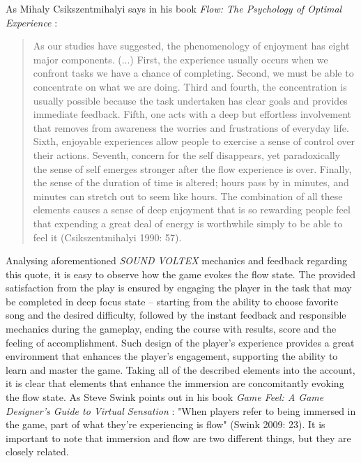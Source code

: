 As Mihaly Csikszentmihalyi says in his book \textit{Flow: The Psychology of Optimal Experience} \cite{csikszentmihalyi1990flow}:
\begin{quote}
    As our studies have suggested, the phenomenology of enjoyment has eight major components. (...) First, the experience usually occurs when we confront tasks we have a chance of completing. Second, we must be able to concentrate on what we are doing. Third and fourth, the concentration is usually possible because the task undertaken has clear goals and provides immediate feedback. Fifth, one acts with a deep but effortless involvement that removes from awareness the worries and frustrations of everyday life. Sixth, enjoyable experiences allow people to exercise a sense of control over their actions. Seventh, concern for the self disappears, yet paradoxically the sense of self emerges stronger after the flow experience is over. Finally, the sense of the duration of time is altered; hours pass by in minutes, and minutes can stretch out to seem like hours. The combination of all these elements causes a sense of deep enjoyment that is so rewarding people feel that expending a great deal of energy is worthwhile simply to be able to feel it (Csikszentmihalyi 1990: 57).
\end{quote}

Analysing aforementioned \textit{SOUND VOLTEX} mechanics and feedback regarding this quote, it is easy to observe how the game evokes the flow state. The provided satisfaction from the play is ensured by engaging the player in the task that may be completed in deep focus state -- starting from the ability to choose favorite song and the desired difficulty, followed by the instant feedback and responsible mechanics during the gameplay, ending the course with results, score and the feeling of accomplishment. Such design of the player’s experience provides a great environment that enhances the player’s engagement, supporting the ability to learn and master the game. Taking all of the described elements into the account, it is clear that elements that enhance the immersion are concomitantly evoking the flow state. As Steve Swink points out in his book \textit{Game Feel: A Game Designer’s Guide to Virtual Sensation} \cite{gamefeel}: "When players refer to being immersed in the game, part of what they’re experiencing is flow" (Swink 2009: 23). It is important to note that immersion and flow are two different things, but they are closely related.

